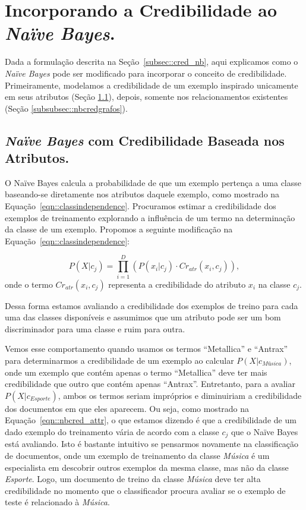 \section{Incorporando a Credibilidade ao \textit{Naïve Bayes}.}
\label{subsubsec::nb_cred}

Dada a formulação descrita na Seção~\ref{subsec::cred_nb}, aqui explicamos como o \textit{Naïve Bayes} pode ser modificado para incorporar o conceito de credibilidade. Primeiramente, modelamos a credibilidade de um exemplo inspirado unicamente em seus atributos (Seção \ref{subsubsec::nbcredatributos}), depois, somente nos relacionamentos existentes (Seção \ref{subsubsec::nbcredgrafos}).

\subsection{\textit{Naïve Bayes} com Credibilidade Baseada nos Atributos.}
\label{subsubsec::nbcredatributos}


O Naïve Bayes calcula a probabilidade de que um exemplo pertença a uma classe baseando-se diretamente nos atributos daquele exemplo, como mostrado na Equação~\ref{eqn::classindependence}.
Procuramos estimar a credibilidade dos exemplos de treinamento explorando a influência de um termo na determinação da classe de um exemplo.
Propomos a seguinte modificação na Equação~\ref{eqn::classindependence}:

\begin{equation}\label{eqn::nbcred_attr}
   P(X|c_{j}) = \prod^{D}_{i=1}{(P(x_i|c_j) \cdot Cr_{atr}(x_i,c_j))},
\end{equation}
onde o termo $Cr_{atr}(x_i,c_j)$ representa a credibilidade do atributo $x_i$ na classe $c_j$.

Dessa forma estamos avaliando a credibilidade dos exemplos de treino para cada uma das classes disponíveis e assumimos que um atributo pode ser um bom discriminador para uma classe e ruim para outra. 

Vemos esse comportamento quando usamos os termos ``Metallica'' e ``Antrax'' para determinarmos a credibilidade de um exemplo ao calcular $P(X|c_{\textit{Música}})$, onde um exemplo que contém apenas o termo ``Metallica'' deve ter mais credibilidade que outro que contém apenas ``Antrax''.
Entretanto, para a avaliar $P(X|c_{\textit{Esporte}})$, ambos os termos seriam impróprios e diminuiriam a credibilidade dos documentos em que eles aparecem.
Ou seja, como mostrado na Equação~\ref{eqn::nbcred_attr}, o que estamos dizendo é que a credibilidade de um dado exemplo do treinamento vária de acordo com a classe $c_j$ que o Naïve Bayes está avaliando. Isto é bastante intuitivo se pensarmos novamente na classificação de documentos, onde um exemplo de treinamento da classe \textit{Música} é um especialista em descobrir outros exemplos da mesma classe, mas não da classe \textit{Esporte}. Logo, um documento de treino da classe \textit{Música} deve ter alta credibilidade no momento que o classificador procura avaliar se o exemplo de teste é relacionado à \textit{Música}.

